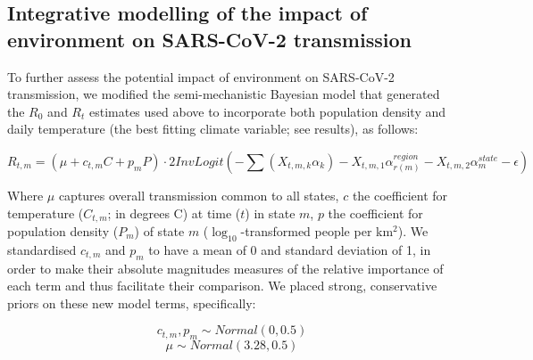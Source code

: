 \documentclass[12pt,english,a4paper]{article}
\newcommand{\virus}{SARS-CoV-2\xspace}
\newcommand{\RO}{$R_0$\xspace}
\begin{document}
\subsection*{Integrative modelling of the impact of environment on \virus transmission}

To further assess the potential impact of environment on \virus transmission, we modified the semi-mechanistic Bayesian model \cite{Unwin2020a} that generated the \RO and $R_t$ estimates used above to incorporate both population density and daily temperature (the best fitting climate variable; see results), as follows:

\begin{equation}
    R_{t,m} = (\mu + c_{t,m}C + p_mP) \cdot 2 InvLogit(-\sum(X_{t,m,k}\alpha_k) -X_{t,m,1}\alpha_{r(m)}^{region} -X_{t,m,2}\alpha_m^{state} - \epsilon)
    \label{eq:Rt}
\end{equation}

Where $\mu$ captures overall transmission common to all states, $c$ the coefficient for temperature ($C_{t,m}$; in degrees C) at time ($t$) in state $m$, $p$ the coefficient for  population density ($P_m$) of state $m$ ($\log_{10}$-transformed people per km$^2$). 
We standardised $c_{t,m}$ and $p_m$ to have a mean of 0 and standard deviation of 1, in order to make their absolute magnitudes measures of the relative importance of each term and thus facilitate their comparison.
We placed strong, conservative priors on these new model terms, specifically:

\begin{equation}
    c_{t,m}, p_m \sim Normal(0, 0.5)
\end{equation}
\begin{equation}
    \mu \sim Normal(3.28, 0.5) 
\end{equation}
\end{document}
